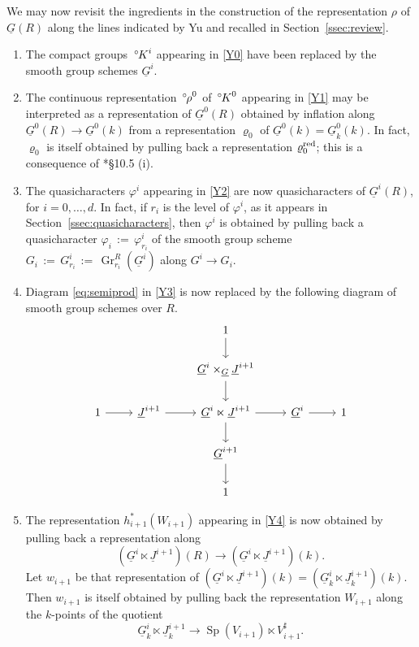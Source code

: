 \documentclass[10pt]{amsart}
\makeatletter
\theoremstyle{plain}
\theoremstyle{definition}
\newcommand{\Fq}{k}
\DeclareMathOperator{\Gr}{Gr}
\newcommand{\ceq}{{\, :=\, }}
\newcommand{\labitem}[2]{
\def\@itemlabel{\textbf{#1}}
\item
\def\@currentlabel{#1}\label{#2}}
\newcommand{\Sp}{{\operatorname{Sp}}}
\newcommand{\oK}{{\,^\circ \hskip-1pt K}}
\newcommand{\orho}{{\,^\circ \hskip-1pt \rho}}
\makeatother
\begin{document}
We may now revisit the ingredients in the construction of the representation $\rho$ of $\underline{G}(R)$ along the lines indicated by Yu and recalled in Section~\ref{ssec:review}.
\begin{enumerate}
\labitem{M0}{M0}
The compact groups $\oK^i$ appearing in \ref{Y0} have been replaced by the smooth group schemes $\underline{G}^i$.
\labitem{M1}{M1}
The continuous representation $\orho^0$ of $\oK^0$ appearing in \ref{Y1} may be interpreted as a representation of $\underline{G}^0(R)$ obtained by inflation along $\underline{G}^0(R) \to \underline{G}^0(\Fq)$ from a representation $\varrho_0$ of $\underline{G}^0(\Fq) = \underline{G}^0_\Fq(\Fq)$.
In fact, $\varrho_0$ is itself obtained by pulling back a representation $\varrho_0^{\operatorname{red}}$; this is a consequence of \cite{Yu:models}*{\S 10.5 (i)}.
\labitem{M2}{M2} The quasicharacters $\varphi^i$ appearing in \ref{Y2} are now quasicharacters of $\underline{G}^i(R)$, for $i=0, \ldots, d$.
In fact, if $r_i$ is the level of $\varphi^i$, as it appears in Section~\ref{ssec:quasicharacters}, then $\varphi^i$ is obtained by pulling back a quasicharacter $\varphi_i\ceq \varphi^i_{r_i}$ of the smooth group scheme $G_i\ceq G^i_{r_i} \ceq \Gr_{r_i}^{R}(\underline{G}^i)$ along $G^i \to G_i$.
\labitem{M3}{M3}
Diagram \eqref{eq:semiprod} in \ref{Y3} is now replaced by the following diagram of smooth group schemes over $R$.
\begin{equation}\label{eq:pimodel}
\begin{tikzcd}
\ && 1 \arrow{d} && \\
\ && \underline{G}^{i}\times_{\underline{G}} \underline{J}^{i+1}\arrow{d} && \\
1 \arrow{r} & \underline{J}^{i+1} \arrow{r} & \underline{G}^i \ltimes \underline{J}^{i+1} \arrow{d} \arrow{r} & \underline{G}^i \arrow{r} & 1\\
&& \underline{G}^{i+1} \arrow{d} && \\
&& 1 &&
\end{tikzcd}
\end{equation}
\labitem{M4}{M4}
The representation $h_{i+1}^*(W_{i+1})$ appearing in \ref{Y4} is now obtained by pulling back a representation along 
\[
(\underline{G}^i \ltimes \underline{J}^{i+1})(R) \to (\underline{G}^i \ltimes \underline{J}^{i+1})(\Fq).
\]
Let $w_{i+1}$ be that representation of $(\underline{G}^i \ltimes \underline{J}^{i+1})(\Fq) = (\underline{G}_\Fq^i \ltimes \underline{J}^{i+1}_\Fq)(\Fq)$. 
Then $w_{i+1}$ is itself obtained by pulling back the representation $W_{i+1}$ along the $\Fq$-points of the quotient
\[
\underline{G}_\Fq^i \ltimes \underline{J}^{i+1}_\Fq \to 
\Sp(V_{i+1}) \ltimes V_{i+1}^\sharp.
\]
\end{enumerate}
\end{document}
